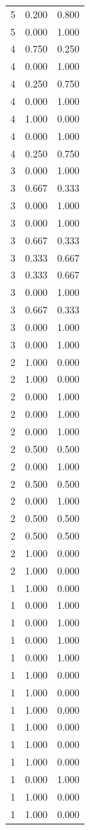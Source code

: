 \begin{tabular}{rrr}
5 & 0.200 & 0.800 \\
5 & 0.000 & 1.000 \\
4 & 0.750 & 0.250 \\
4 & 0.000 & 1.000 \\
4 & 0.250 & 0.750 \\
4 & 0.000 & 1.000 \\
4 & 1.000 & 0.000 \\
4 & 0.000 & 1.000 \\
4 & 0.250 & 0.750 \\
3 & 0.000 & 1.000 \\
3 & 0.667 & 0.333 \\
3 & 0.000 & 1.000 \\
3 & 0.000 & 1.000 \\
3 & 0.667 & 0.333 \\
3 & 0.333 & 0.667 \\
3 & 0.333 & 0.667 \\
3 & 0.000 & 1.000 \\
3 & 0.667 & 0.333 \\
3 & 0.000 & 1.000 \\
3 & 0.000 & 1.000 \\
2 & 1.000 & 0.000 \\
2 & 1.000 & 0.000 \\
2 & 0.000 & 1.000 \\
2 & 0.000 & 1.000 \\
2 & 0.000 & 1.000 \\
2 & 0.500 & 0.500 \\
2 & 0.000 & 1.000 \\
2 & 0.500 & 0.500 \\
2 & 0.000 & 1.000 \\
2 & 0.500 & 0.500 \\
2 & 0.500 & 0.500 \\
2 & 1.000 & 0.000 \\
2 & 1.000 & 0.000 \\
1 & 1.000 & 0.000 \\
1 & 0.000 & 1.000 \\
1 & 0.000 & 1.000 \\
1 & 0.000 & 1.000 \\
1 & 0.000 & 1.000 \\
1 & 1.000 & 0.000 \\
1 & 1.000 & 0.000 \\
1 & 1.000 & 0.000 \\
1 & 1.000 & 0.000 \\
1 & 1.000 & 0.000 \\
1 & 1.000 & 0.000 \\
1 & 0.000 & 1.000 \\
1 & 1.000 & 0.000 \\
1 & 1.000 & 0.000 \\
\bottomrule
\end{tabular}
